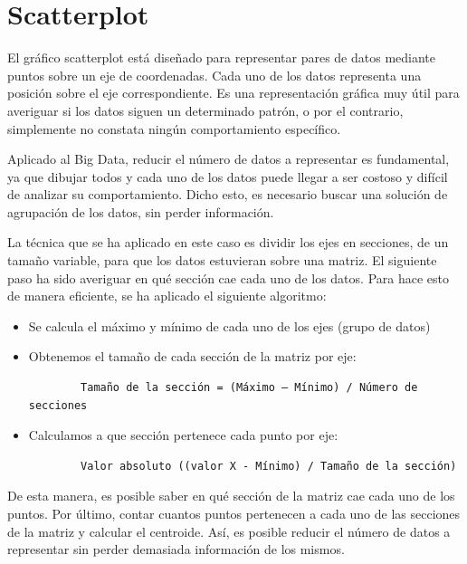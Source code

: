 
\section{Scatterplot}
El gráfico scatterplot está diseñado para representar pares de datos mediante puntos sobre un eje de coordenadas. Cada uno de los datos representa una posición sobre el eje correspondiente. Es una representación gráfica muy útil para averiguar si los datos siguen un determinado patrón, o por el contrario, simplemente no constata ningún comportamiento específico.

Aplicado al Big Data, reducir el número de datos a representar es fundamental, ya que dibujar todos y cada uno de los datos puede llegar a ser costoso y difícil de analizar su comportamiento. Dicho esto, es necesario buscar una solución de agrupación de los datos, sin perder información.

La técnica que se ha aplicado en este caso es dividir los ejes en secciones, de un tamaño variable, para que los datos estuvieran sobre una matriz. El siguiente paso ha sido averiguar en qué sección cae cada uno de los datos. Para hace esto de manera eficiente, se ha aplicado el siguiente algoritmo:
\begin{itemize}
	\item Se calcula el máximo y mínimo de cada uno de los ejes (grupo de datos)
	\item Obtenemos el tamaño de cada sección de la matriz por eje:
	\begin{verbatim}
		Tamaño de la sección = (Máximo – Mínimo) / Número de secciones
	\end{verbatim}
	\item Calculamos a que sección pertenece cada punto por eje:
	\begin{verbatim}
		Valor absoluto ((valor X - Mínimo) / Tamaño de la sección)
	\end{verbatim}
\end{itemize}

De esta manera, es posible saber en qué sección de la matriz cae cada uno de los puntos. Por último, contar cuantos puntos pertenecen a cada uno de las secciones de la matriz y calcular el centroide. Así, es posible reducir el número de datos a representar sin perder demasiada información de los mismos.

